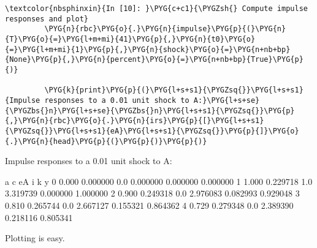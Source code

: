 \documentclass[letterpaper,10pt,openany,oneside,english]{sphinxmanual}
\begin{document}
\begin{Verbatim}[commandchars=\\\{\}]
\textcolor{nbsphinxin}{In [10]: }\PYG{c+c1}{\PYGZsh{} Compute impulse responses and plot}
         \PYG{n}{rbc}\PYG{o}{.}\PYG{n}{impulse}\PYG{p}{(}\PYG{n}{T}\PYG{o}{=}\PYG{l+m+mi}{41}\PYG{p}{,}\PYG{n}{t0}\PYG{o}{=}\PYG{l+m+mi}{1}\PYG{p}{,}\PYG{n}{shock}\PYG{o}{=}\PYG{n+nb+bp}{None}\PYG{p}{,}\PYG{n}{percent}\PYG{o}{=}\PYG{n+nb+bp}{True}\PYG{p}{)}
         
         \PYG{k}{print}\PYG{p}{(}\PYG{l+s+s1}{\PYGZsq{}}\PYG{l+s+s1}{Impulse responses to a 0.01 unit shock to A:}\PYG{l+s+se}{\PYGZbs{}n}\PYG{l+s+se}{\PYGZbs{}n}\PYG{l+s+s1}{\PYGZsq{}}\PYG{p}{,}\PYG{n}{rbc}\PYG{o}{.}\PYG{n}{irs}\PYG{p}{[}\PYG{l+s+s1}{\PYGZsq{}}\PYG{l+s+s1}{eA}\PYG{l+s+s1}{\PYGZsq{}}\PYG{p}{]}\PYG{o}{.}\PYG{n}{head}\PYG{p}{(}\PYG{p}{)}\PYG{p}{)}
\end{Verbatim}
\begin{OriginalVerbatim}[commandchars=\\\{\}]
Impulse responses to a 0.01 unit shock to A:

        a         c   eA         i         k         y
0  0.000  0.000000  0.0  0.000000  0.000000  0.000000
1  1.000  0.229718  1.0  3.319739  0.000000  1.000000
2  0.900  0.249318  0.0  2.976083  0.082993  0.929048
3  0.810  0.265744  0.0  2.667127  0.155321  0.864362
4  0.729  0.279348  0.0  2.389390  0.218116  0.805341
\end{OriginalVerbatim}
Plotting is easy.
\end{document}
